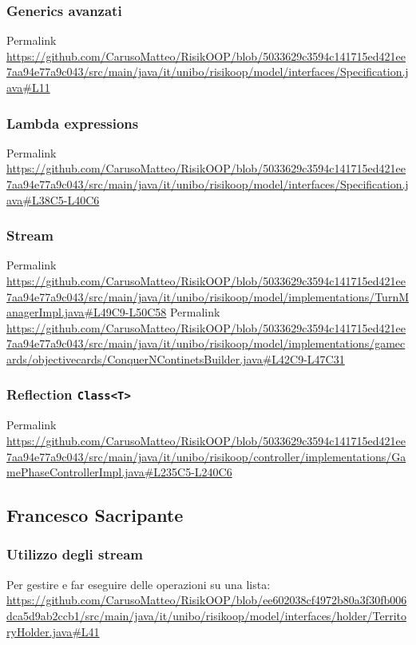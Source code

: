 \documentclass[a4paper,12pt]{report}
\begin{document}
\subsubsection{Generics avanzati}
Permalink \url{https://github.com/CarusoMatteo/RisikOOP/blob/5033629c3594c141715ed421ee7aa94e77a9c043/src/main/java/it/unibo/risikoop/model/interfaces/Specification.java#L11}

\subsubsection{Lambda expressions}
Permalink \url{https://github.com/CarusoMatteo/RisikOOP/blob/5033629c3594c141715ed421ee7aa94e77a9c043/src/main/java/it/unibo/risikoop/model/interfaces/Specification.java#L38C5-L40C6}


\subsubsection{Stream}
Permalink \url{https://github.com/CarusoMatteo/RisikOOP/blob/5033629c3594c141715ed421ee7aa94e77a9c043/src/main/java/it/unibo/risikoop/model/implementations/TurnManagerImpl.java#L49C9-L50C58}
Permalink \url{https://github.com/CarusoMatteo/RisikOOP/blob/5033629c3594c141715ed421ee7aa94e77a9c043/src/main/java/it/unibo/risikoop/model/implementations/gamecards/objectivecards/ConquerNContinetsBuilder.java#L42C9-L47C31}

\subsubsection{Reflection \texttt{Class<T>}}
Permalink \url{https://github.com/CarusoMatteo/RisikOOP/blob/5033629c3594c141715ed421ee7aa94e77a9c043/src/main/java/it/unibo/risikoop/controller/implementations/GamePhaseControllerImpl.java#L235C5-L240C6}

\subsection{Francesco Sacripante}
\subsubsection{Utilizzo degli stream}
Per gestire e far eseguire delle operazioni su una lista: \url{https://github.com/CarusoMatteo/RisikOOP/blob/ee602038cf4972b80a3f30fb006dca5d9ab2ccb1/src/main/java/it/unibo/risikoop/model/interfaces/holder/TerritoryHolder.java#L41}
\end{document}
